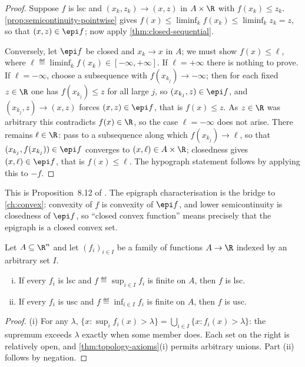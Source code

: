 \begin{proof}
	Suppose $f$ is lsc and $(x_k,z_k)\to(x,z)$ in $A\times\R$ with $f(x_k)\leq z_k$.
	\autoref{prop:semicontinuity-pointwise} gives
	$f(x)\leq\liminf_kf(x_k)\leq\liminf_kz_k=z$, so that $(x,z)\in\epi f$; now
	apply \autoref{thm:closed-sequential}.

	Conversely, let $\epi f$ be closed and $x_k\to x$ in $A$; we must show
	$f(x)\leq\ell$, where $\ell\eqdef\liminf_kf(x_k)\in[-\infty,+\infty]$. If
	$\ell=+\infty$ there is nothing to prove. If $\ell=-\infty$, choose a
	subsequence with $f(x_{k_j})\to-\infty$; then for each fixed $z\in\R$ one has
	$f(x_{k_j})\leq z$ for all large $j$, so $(x_{k_j},z)\in\epi f$, and
	$(x_{k_j},z)\to(x,z)$ forces $(x,z)\in\epi f$, that is $f(x)\leq z$. As
	$z\in\R$ was arbitrary this contradicts $f(x)\in\R$, so the case
	$\ell=-\infty$ does not arise. There remains $\ell\in\R$: pass to a
	subsequence along which $f(x_{k_j})\to\ell$, so that
	$(x_{k_j},f(x_{k_j}))\in\epi f$ converges to $(x,\ell)\in A\times\R$; closedness
	gives $(x,\ell)\in\epi f$, that is $f(x)\leq\ell$. The hypograph statement
	follows by applying this to $-f$.
\end{proof}

This is Proposition~8.12 of \textcite[p.~273]{fukuda2026notes}. The epigraph
characterisation is the bridge to \autoref{ch:convex}: convexity of $f$ is
convexity of $\epi f$, and lower semicontinuity is closedness of $\epi f$, so
``closed convex function'' means precisely that the epigraph is a closed convex
set.

\begin{proposition}\label{prop:sup-semicontinuous}
	Let $A\subseteq\R^n$ and let $(f_i)_{i\in I}$ be a family of functions
	$A\to\R$ indexed by an arbitrary set $I$.
	\begin{enumerate}[(i)]
		\item If every $f_i$ is lsc and $f\eqdef\sup_{i\in I}f_i$ is finite on $A$,
		      then $f$ is lsc.
		\item If every $f_i$ is usc and $f\eqdef\inf_{i\in I}f_i$ is finite on $A$,
		      then $f$ is usc.
	\end{enumerate}
\end{proposition}

\begin{proof}
	(i) For any $\lambda$,
	$\{x : \sup_if_i(x)>\lambda\}=\bigcup_{i\in I}\{x : f_i(x)>\lambda\}$: the
	supremum exceeds $\lambda$ exactly when some member does. Each set on the right
	is relatively open, and \autoref{thm:topology-axioms}(i) permits arbitrary
	unions. Part (ii) follows by negation.
\end{proof}

